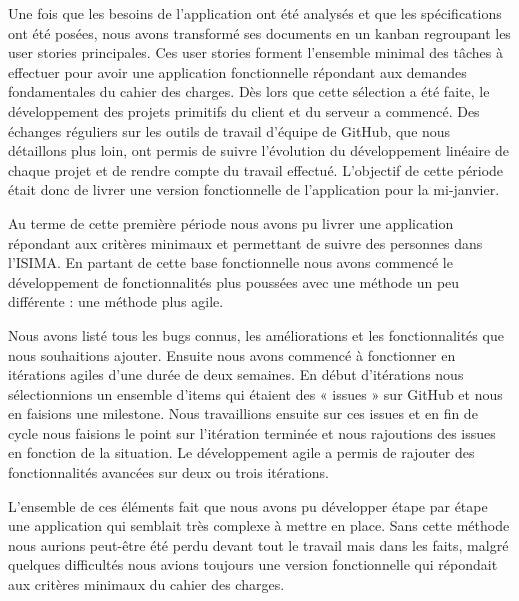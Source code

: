Une fois que les besoins de l’application ont été analysés et que les spécifications ont été posées, nous avons transformé ses documents en un kanban regroupant les user stories principales. Ces user stories forment l’ensemble minimal des tâches à effectuer pour avoir une application fonctionnelle répondant aux demandes fondamentales du cahier des charges. Dès lors que cette sélection a été faite, le développement des projets primitifs du client et du serveur a commencé. Des échanges réguliers sur les outils de travail d’équipe de GitHub, que nous détaillons plus loin, ont permis de suivre l’évolution du développement linéaire de chaque projet et de rendre compte du travail effectué. L’objectif de cette période était donc de livrer une version fonctionnelle de l’application pour la mi-janvier.

Au terme de cette première période nous avons pu livrer une application répondant aux critères minimaux et permettant de suivre des personnes dans l’ISIMA. En partant de cette base fonctionnelle nous avons commencé le développement de fonctionnalités plus poussées avec une méthode un peu différente : une méthode plus agile.

Nous avons listé tous les bugs connus, les améliorations et les fonctionnalités que nous souhaitions ajouter. Ensuite nous avons commencé à fonctionner en itérations agiles d’une durée de deux semaines. En début d’itérations nous sélectionnions un ensemble d’items qui étaient des « issues » sur GitHub et nous en faisions une milestone. Nous travaillions ensuite sur ces issues et en fin de cycle nous faisions le point sur l’itération terminée et nous rajoutions des issues en fonction de la situation. Le développement agile a permis de rajouter des fonctionnalités avancées sur deux ou trois itérations.

L’ensemble de ces éléments fait que nous avons pu développer étape par étape une application qui semblait très complexe à mettre en place. Sans cette méthode nous aurions peut-être été perdu devant tout le travail mais dans les faits, malgré quelques difficultés nous avions toujours une version fonctionnelle qui répondait aux critères minimaux du cahier des charges.